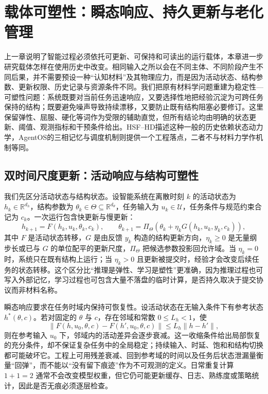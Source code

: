 \chapter{载体可塑性：瞬态响应、持久更新与老化管理}
\label{chap:material_science_of_cognitive_matter}

上一章说明了智能过程必须依托可更新、可保持和可读出的运行载体，本章进一步研究载体怎样在使用历史中改变。相同输入之所以会在不同主体、不同阶段产生不同后果，并不需要预设一种“认知材料”及其物理应力，而是因为活动状态、结构参数、更新权限、历史记录与资源条件不同。我们把原有材料学问题重建为稳定性—可塑性问题：系统既要对当前任务迅速响应，又要选择性地把经验沉淀为可跨任务保持的结构；既要避免噪声导致持续漂移，又要防止既有结构阻塞必要修订。这里保留弹性、屈服、硬化等词作为受限的辅助直觉，但所有结论均由明确的状态更新、阈值、观测指标和干预条件给出。HSF--HD描述这种一般的历史依赖状态动力学，AgentOS的三相记忆与调度机制则提供一个工程落点，二者不与材料力学作机制等同。

\section{双时间尺度更新：活动响应与结构可塑性}

我们先区分活动状态与结构状态。设智能系统在离散时刻 $k$ 的活动状态为 $h_k\in\mathbb R^{d_h}$，结构参数为 $\theta_k\in\Theta\subseteq\mathbb R^{d_\theta}$，任务输入为 $u_k\in\mathcal U$，任务条件与规范约束合记为 $c_k$。一次运行包含快更新与慢更新：
\[
h_{k+1}=F(h_k,u_k,\theta_k,c_k),\qquad
\theta_{k+1}=\Pi_\Theta\!\left(\theta_k+\eta_k G(h_k,u_k,y_k,c_k)\right),
\]
其中 $F$ 是活动状态转移，$G$ 是由反馈 $y_k$ 构造的结构更新方向，$\eta_k\ge0$ 是无量纲步长或已与 $G$ 的单位配平的更新尺度，$\Pi_\Theta$ 把候选参数投影回允许域。当 $\eta_k=0$ 时，系统只在既有结构上运行；当 $\eta_k>0$ 且更新被提交时，经验才会改变后续任务的状态转移。这个区分比“推理是弹性、学习是塑性”更准确，因为推理过程也可写入外部记忆，学习过程也可包含大量不落盘的临时计算，是否持久取决于提交协议而非材料名称。

瞬态响应要求在任务时域内保持可恢复性。设活动状态在无输入条件下有参考状态 $h^*(\theta,c)$。若对固定的 $\theta$ 与 $c$，存在邻域和常数 $0\le L_h<1$，使
\[
\|F(h,u_0,\theta,c)-F(h',u_0,\theta,c)\|\le L_h\|h-h'\|,
\]
则在参考输入 $u_0$ 下，邻域内的活动差异会逐步衰减。这一收缩条件给出局部恢复的充分条件，却不保证复杂任务中的全局稳定；持续输入、时延、饱和和结构切换都可能破坏它。工程上可用残差衰减、回到参考域的时间以及任务后状态泄漏量衡量“回弹”，而不能以“没有留下痕迹”作为不可观测的定义。日常重复计算 $1+1=2$ 通常不会改变模型权重，但它仍可能更新缓存、日志、熟练度或策略统计，因此是否无痕必须逐层检查。

